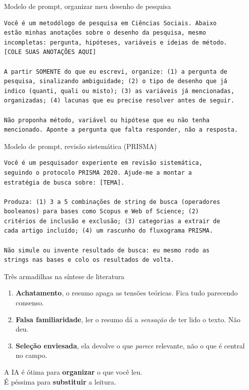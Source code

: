\documentclass[11pt,aspectratio=169,t]{beamer}
\begin{document}
\begin{frame}[fragile]{Modelo de prompt, organizar meu desenho de pesquisa}
\begin{lstlisting}
Você é um metodólogo de pesquisa em Ciências Sociais. Abaixo
estão minhas anotações sobre o desenho da pesquisa, mesmo
incompletas: pergunta, hipóteses, variáveis e ideias de método.
[COLE SUAS ANOTAÇÕES AQUI]

A partir SOMENTE do que eu escrevi, organize: (1) a pergunta de
pesquisa, sinalizando ambiguidade; (2) o tipo de desenho que já
indico (quanti, quali ou misto); (3) as variáveis já mencionadas,
organizadas; (4) lacunas que eu precise resolver antes de seguir.

Não proponha método, variável ou hipótese que eu não tenha
mencionado. Aponte a pergunta que falta responder, não a resposta.
\end{lstlisting}
\end{frame}

\begin{frame}[fragile]{Modelo de prompt, revisão sistemática (PRISMA)}
\begin{lstlisting}
Você é um pesquisador experiente em revisão sistemática,
seguindo o protocolo PRISMA 2020. Ajude-me a montar a
estratégia de busca sobre: [TEMA].

Produza: (1) 3 a 5 combinações de string de busca (operadores
booleanos) para bases como Scopus e Web of Science; (2)
critérios de inclusão e exclusão; (3) categorias a extrair de
cada artigo incluído; (4) um rascunho do fluxograma PRISMA.

Não simule ou invente resultado de busca: eu mesmo rodo as
strings nas bases e colo os resultados de volta.
\end{lstlisting}
\end{frame}

\begin{frame}{Três armadilhas na síntese de literatura}
  \begin{enumerate}
    \item \textbf{Achatamento}, o resumo apaga as tensões teóricas. Fica tudo parecendo consenso.
    \pause
    \item \textbf{Falsa familiaridade}, ler o resumo dá a \textit{sensação} de ter lido o texto. Não deu.
    \pause
    \item \textbf{Seleção enviesada}, ela devolve o que \textit{parece} relevante, não o que é central no campo.
  \end{enumerate}
  \pause
  \vfill
  \begin{block}{}
    \centering A IA é ótima para \textbf{organizar} o que você leu. \\ É péssima para \textbf{substituir} a leitura.
  \end{block}
\end{frame}
\end{document}

